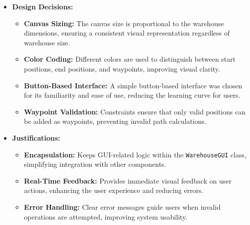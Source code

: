 \begin{itemize}
\item \textbf{Design Decisions:}
\begin{itemize}
    \item \textbf{Canvas Sizing:} The canvas size is proportional to the warehouse dimensions, ensuring a consistent visual representation regardless of warehouse size.
    \item \textbf{Color Coding:} Different colors are used to distinguish between start positions, end positions, and waypoints, improving visual clarity.
    \item \textbf{Button-Based Interface:} A simple button-based interface was chosen for its familiarity and ease of use, reducing the learning curve for users.
    \item \textbf{Waypoint Validation:} Constraints ensure that only valid positions can be added as waypoints, preventing invalid path calculations.
\end{itemize}

\item \textbf{Justifications:}
\begin{itemize}
    \item \textbf{Encapsulation:} Keeps GUI-related logic within the \verb|WarehouseGUI| class, simplifying integration with other components.
    \item \textbf{Real-Time Feedback:} Provides immediate visual feedback on user actions, enhancing the user experience and reducing errors.
    \item \textbf{Error Handling:} Clear error messages guide users when invalid operations are attempted, improving system usability.

\end{itemize}
\end{itemize}

